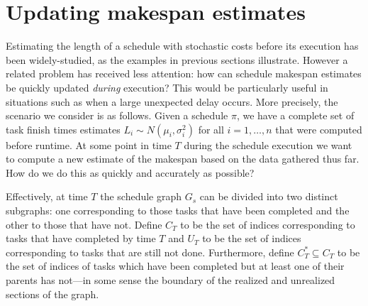 \documentclass[12pt]{article}
\def\P{\mathbb{P}}
\def\E{\mathbb{E}}
\newtheorem{prop}[theorem]{Proposition}
\begin{document}


\section{Updating makespan estimates}
\label{sect.updating}


Estimating the length of a schedule with stochastic costs before its execution has been widely-studied, as the examples in previous sections illustrate. However a related problem has received less attention: how can schedule makespan estimates be quickly updated {\em during} execution? This would be particularly useful in situations such as when a large unexpected delay occurs. More precisely, the scenario we consider is as follows. Given a schedule $\pi$, we have a complete set of task finish times estimates $L_i \sim N(\mu_i, \sigma_i^2)$ for all $i = 1, \dots, n$ that were computed before runtime. At some point in time $T$ during the schedule execution we want to compute a new estimate of the makespan based on the data gathered thus far. How do we do this as quickly and accurately as possible?

Effectively, at time $T$ the schedule graph $G_s$ can be divided into two distinct subgraphs: one corresponding to those tasks that have been completed and the other to those that have not. Define $C_T$ to be the set of indices corresponding to tasks that have completed by time $T$ and $U_T$ to be the set of indices corresponding to tasks that are still not done. Furthermore, define $C_T^* \subseteq C_T$ to be the set of indices of tasks which have been completed but at least one of their parents has not---in some sense the boundary of the realized and unrealized sections of the graph.
\end{document}
